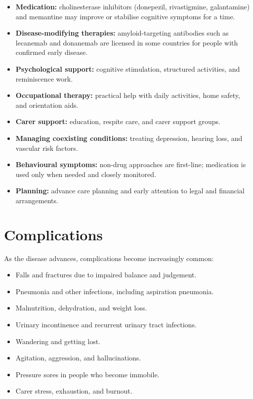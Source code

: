 \begin{itemize}
    \item \textbf{Medication:} cholinesterase inhibitors (donepezil, rivastigmine, galantamine) and memantine may improve or stabilise cognitive symptoms for a time.
    \item \textbf{Disease-modifying therapies:} amyloid-targeting antibodies such as lecanemab and donanemab are licensed in some countries for people with confirmed early disease.
    \item \textbf{Psychological support:} cognitive stimulation, structured activities, and reminiscence work.
    \item \textbf{Occupational therapy:} practical help with daily activities, home safety, and orientation aids.
    \item \textbf{Carer support:} education, respite care, and carer support groups.
    \item \textbf{Managing coexisting conditions:} treating depression, hearing loss, and vascular risk factors.
    \item \textbf{Behavioural symptoms:} non-drug approaches are first-line; medication is used only when needed and closely monitored.
    \item \textbf{Planning:} advance care planning and early attention to legal and financial arrangements.
\end{itemize}

\section*{Complications}
As the disease advances, complications become increasingly common:

\begin{itemize}
    \item Falls and fractures due to impaired balance and judgement.
    \item Pneumonia and other infections, including aspiration pneumonia.
    \item Malnutrition, dehydration, and weight loss.
    \item Urinary incontinence and recurrent urinary tract infections.
    \item Wandering and getting lost.
    \item Agitation, aggression, and hallucinations.
    \item Pressure sores in people who become immobile.
    \item Carer stress, exhaustion, and burnout.
\end{itemize}

